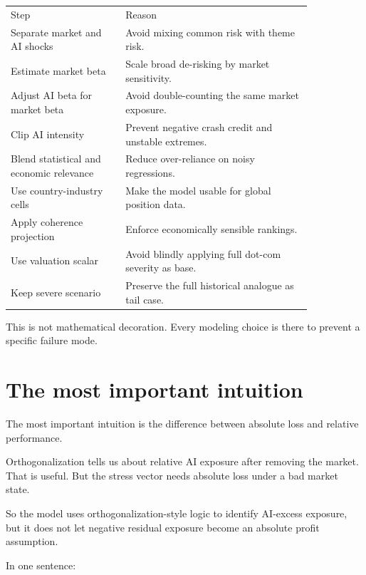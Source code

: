 \documentclass[10pt]{article}
\begin{document}
\begin{center}
\begin{tabular}{p{0.32\linewidth}p{0.52\linewidth}}
Step & Reason \\
Separate market and AI shocks & Avoid mixing common risk with theme risk. \\
Estimate market beta & Scale broad de-risking by market sensitivity. \\
Adjust AI beta for market beta & Avoid double-counting the same market exposure. \\
Clip AI intensity & Prevent negative crash credit and unstable extremes. \\
Blend statistical and economic relevance & Reduce over-reliance on noisy regressions. \\
Use country-industry cells & Make the model usable for global position data. \\
Apply coherence projection & Enforce economically sensible rankings. \\
Use valuation scalar & Avoid blindly applying full dot-com severity as base. \\
Keep severe scenario & Preserve the full historical analogue as tail case.
\end{tabular}
\end{center}

This is not mathematical decoration. Every modeling choice is there to prevent a specific failure mode.

\section{The most important intuition}

The most important intuition is the difference between absolute loss and relative performance.

Orthogonalization tells us about relative AI exposure after removing the market. That is useful. But the stress vector needs absolute loss under a bad market state.

So the model uses orthogonalization-style logic to identify AI-excess exposure, but it does not let negative residual exposure become an absolute profit assumption.

In one sentence:

\begin{center}
\end{center}
\end{document}
